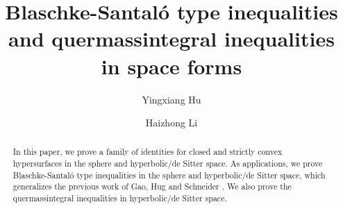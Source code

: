 \documentclass[11pt,reqno]{amsart}
\theoremstyle{definition}
\theoremstyle{remark}
\numberwithin{equation}{section}
\renewcommand{\(}{\left(}
\renewcommand{\)}{\right)}
\renewcommand{\~}{\tilde}
\renewcommand{\-}{\overline}
\begin{document}
\title[Blaschke-Santal\'o type inequalities and quermassintegral inequalities]{Blaschke-Santal\'o type inequalities and quermassintegral inequalities in space forms}
	
\author{Yingxiang Hu}
	\address{School of Mathematics, Beihang University, Beijing 100191, P.R. China}
\author{Haizhong Li}
\address{Department of Mathematical Sciences, Tsinghua University, Beijing 100084, P.R. China}
	
	
	
	\begin{abstract}
		In this paper, we prove a family of identities for closed and strictly convex hypersurfaces in the sphere and hyperbolic/de Sitter space. As applications, we prove Blaschke-Santal\'o type inequalities in the sphere and hyperbolic/de Sitter space, which generalizes the previous work of Gao, Hug and Schneider \cite{GHS03}. We also prove the quermassintegral inequalities in hyperbolic/de Sitter space.
	\end{abstract}	
	\maketitle
\end{document}
